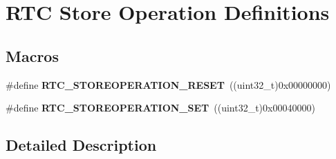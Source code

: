 \hypertarget{group___r_t_c___store_operation___definitions}{}\section{R\+TC Store Operation Definitions}
\label{group___r_t_c___store_operation___definitions}
\subsection*{Macros}
\begin{DoxyCompactItemize}
\item 
\#define {\bfseries R\+T\+C\+\_\+\+S\+T\+O\+R\+E\+O\+P\+E\+R\+A\+T\+I\+O\+N\+\_\+\+R\+E\+S\+ET}~((uint32\+\_\+t)0x00000000)\hypertarget{group___r_t_c___store_operation___definitions_ga0c0fb2efa26fd29872759f6162fafefa}{}\label{group___r_t_c___store_operation___definitions_ga0c0fb2efa26fd29872759f6162fafefa}

\item 
\#define {\bfseries R\+T\+C\+\_\+\+S\+T\+O\+R\+E\+O\+P\+E\+R\+A\+T\+I\+O\+N\+\_\+\+S\+ET}~((uint32\+\_\+t)0x00040000)\hypertarget{group___r_t_c___store_operation___definitions_ga984ee81edc6b876d035683d65a5c60d8}{}\label{group___r_t_c___store_operation___definitions_ga984ee81edc6b876d035683d65a5c60d8}

\end{DoxyCompactItemize}


\subsection{Detailed Description}
